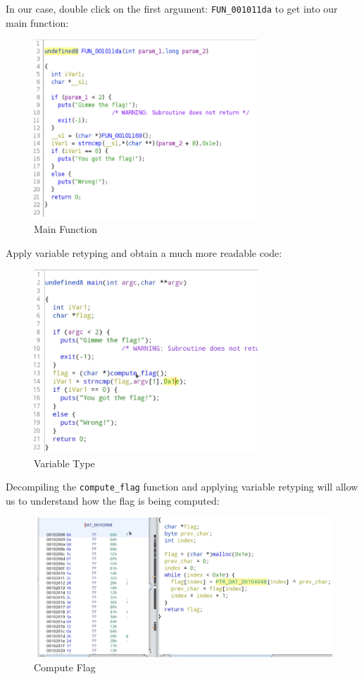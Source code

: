\documentclass{article}
\begin{document}
\pagebreak
\noindent\linebreak
In our case, double click on the first argument: \texttt{FUN\_001011da} to get into our main function:
\begin{figure}[H]
\centering
\includegraphics[width=0.75\textwidth]{img/ghidra_4.jpg}
\caption{Main Function}
\label{fig:ghidra_4}
\end{figure}

\noindent
Apply variable retyping and obtain a much more readable code:
\begin{figure}[H]
\centering
\includegraphics[width=0.75\textwidth]{img/ghidra_5.jpg}
\caption{Variable Type}
\label{fig:ghidra_5}
\end{figure}

\noindent\linebreak
Decompiling the \texttt{compute\_flag} function and applying variable retyping will allow us to understand how
the flag is being computed:
\begin{figure}[H]
\centering
\includegraphics[width=1\textwidth]{img/ghidra_6.jpg}
\caption{Compute Flag}
\label{fig:ghidra_6}
\end{figure}
\end{document}
